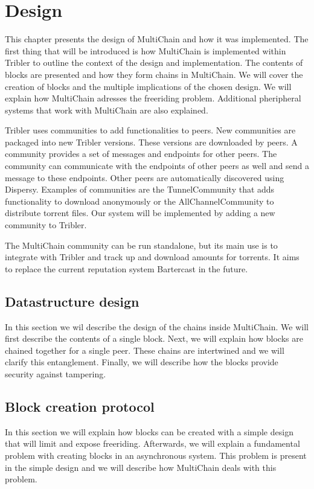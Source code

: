\chapter{Design}
\label{chapt:design}
This chapter presents the design of MultiChain and how it was implemented.
The first thing that will be introduced is how MultiChain is implemented within Tribler
to outline the context of the design and implementation.
The contents of blocks are presented and how they form chains in MultiChain.
We will cover the creation of blocks and the multiple implications of the chosen design.
We will explain how MultiChain adresses the freeriding problem.
Additional pheripheral systems that work with MultiChain are also explained.

Tribler uses communities to add functionalities to peers.
New communities are packaged into new Tribler versions.
These versions are downloaded by peers.
A community provides a set of messages and endpoints for other peers.
The community can communicate with the endpoints of other peers as well and send a message to these endpoints.
Other peers are automatically discovered using Dispersy.
Examples of communities are the TunnelCommunity that adds functionality to download anonymously\cite{Plak-anonymous}\cite{tanaskoski-anonymous}
or the AllChannelCommunity to distribute torrent files.
Our system will be implemented by adding a new community to Tribler.

The MultiChain community can be run standalone,
but its main use is to integrate with Tribler and track up and download amounts for torrents.
It aims to replace the current reputation system Bartercast in the future.

\section{Datastructure design}
In this section we wil describe the design of the chains inside MultiChain.
We will first describe the contents of a single block.
Next, we will explain how blocks are chained together for a single peer.
These chains are intertwined and we will clarify this entanglement.
Finally, we will describe how the blocks provide security against tampering.






\section{Block creation protocol}
\label{design:block_creation}
In this section we will explain how blocks can be created with a simple design
that will limit and expose freeriding.
Afterwards, we will explain a fundamental problem with creating blocks in an asynchronous system.
This problem is present in the simple design
and we will describe how MultiChain deals with this problem.

